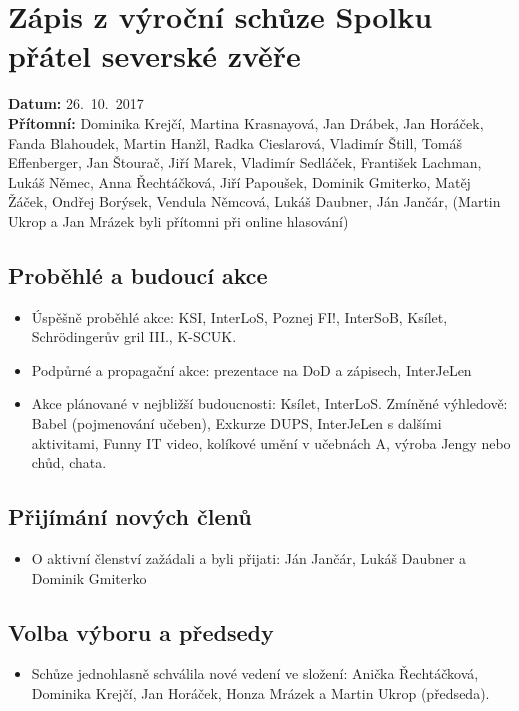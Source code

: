 \documentclass[11pt,a4paper]{article}
\begin{document}
\section*{Zápis z výroční schůze Spolku přátel severské zvěře}
\textbf{Datum:} 26.~10.~2017\\
\textbf{Přítomní:} Dominika Krejčí, Martina Krasnayová, Jan Drábek, Jan Horáček, Fanda Blahoudek, Martin Hanžl, Radka Cieslarová, Vladimír Štill, Tomáš Effenberger, Jan Štourač, Jiří Marek, Vladimír Sedláček,  František Lachman, Lukáš Němec, Anna Řechtáčková, Jiří Papoušek, Dominik Gmiterko, Matěj Žáček, Ondřej Borýsek, Vendula Němcová, Lukáš Daubner, Ján Jančár, (Martin Ukrop a Jan Mrázek byli přítomni při online hlasování)

\subsection*{Proběhlé a budoucí akce}
\begin{itemize}[itemsep=0pt]
\item Úspěšně proběhlé akce: KSI, InterLoS, Poznej FI!, InterSoB, Ksílet, Schrödingerův gril III., K-SCUK.
\item Podpůrné a propagační akce: prezentace na DoD a zápisech, InterJeLen
\item Akce plánované v nejbližší budoucnosti: Ksílet, InterLoS. Zmíněné výhledově: Babel (pojmenování učeben), Exkurze DUPS, InterJeLen s dalšími aktivitami, Funny IT video, kolíkové umění v učebnách A, výroba Jengy nebo chůd, chata.
\end{itemize}

\subsection*{Přijímání nových členů}
\begin{itemize}[itemsep=0pt]
\item O aktivní členství zažádali a byli přijati: Ján Jančár, Lukáš Daubner a Dominik Gmiterko
\end{itemize}

\subsection*{Volba výboru a předsedy}
\begin{itemize}[itemsep=0pt]
\item Schůze jednohlasně schválila nové vedení ve složení: Anička Řechtáčková, Dominika Krejčí, Jan Horáček, Honza Mrázek a Martin Ukrop (předseda).
\end{itemize}
\end{document}
